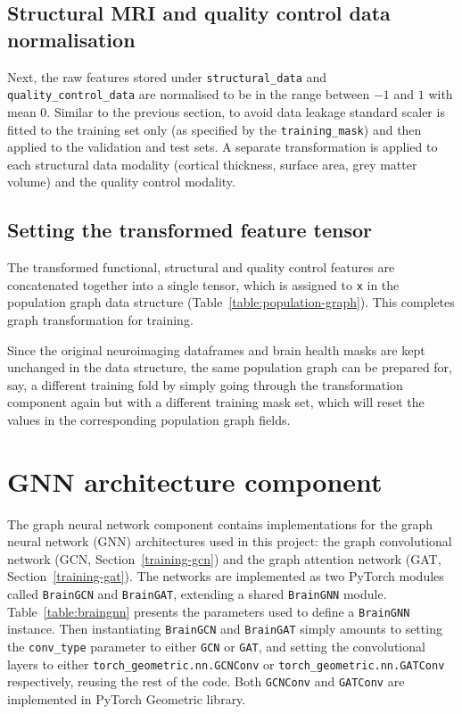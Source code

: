 \subsection{Structural MRI and quality control data normalisation}
Next, the raw features stored under \texttt{structural\_data} and \texttt{quality\_control\_data} are normalised to be in the range between $-1$ and $1$ with mean 0. Similar to the previous section, to avoid data leakage standard scaler is fitted to the training set only (as specified by the \texttt{training\_mask}) and then applied to the validation and test sets. A separate transformation is applied to each structural data modality (cortical thickness, surface area, grey matter volume) and the quality control modality.

\subsection{Setting the transformed feature tensor}
The transformed functional, structural and quality control features are concatenated together into a single tensor, which is assigned to \texttt{x} in the population graph data structure (Table~\ref{table:population-graph}). This completes graph transformation for training.

Since the original neuroimaging dataframes and brain health masks are kept unchanged in the data structure, the same population graph can be prepared for, say, a different training fold by simply going through the transformation component again but with a different training mask set, which will reset the values in the corresponding population graph fields.

\section{GNN architecture component}
\label{section:gnn-architecture}

The graph neural network component contains implementations for the graph neural network (GNN) architectures used in this project: the graph convolutional network (GCN, Section~\ref{training-gcn}) and the graph attention network (GAT, Section~\ref{training-gat}). The networks are implemented as two PyTorch modules called \texttt{BrainGCN} and \texttt{BrainGAT}, extending a shared \texttt{BrainGNN} module. Table~\ref{table:braingnn} presents the parameters used to define a \texttt{BrainGNN} instance. Then instantiating \texttt{BrainGCN} and \texttt{BrainGAT} simply amounts to setting the \texttt{conv\_type} parameter to either \texttt{GCN} or \texttt{GAT}, and setting the convolutional layers to either \texttt{torch\_geometric.nn.GCNConv} or \texttt{torch\_geometric.nn.GATConv} respectively, reusing the rest of the code. Both \texttt{GCNConv} and \texttt{GATConv} are implemented in PyTorch Geometric library.


